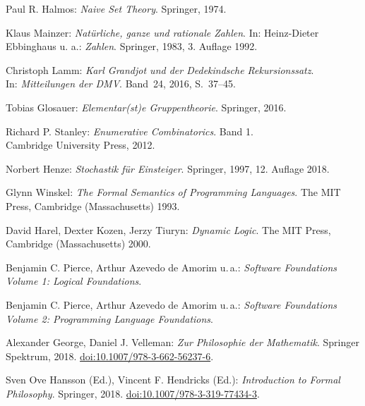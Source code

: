 \begin{thebibliography}{00}
 Paul R. Halmos:
\emph{Naive Set Theory}. Springer, 1974.

 Klaus Mainzer:
\emph{Natürliche, ganze und rationale Zahlen}.
In: Heinz-Dieter Ebbinghaus u. a.: \emph{Zahlen}.
Springer, 1983, 3. Auflage 1992.

 Christoph Lamm:
\emph{Karl Grandjot und der Dedekindsche Rekursionssatz}.\\
In: \emph{Mitteilungen der DMV}. Band~24, 2016, S.~37--45.

 Tobias Glosauer:
\emph{Elementar(st)e Gruppentheorie}.
Springer, 2016.

 Richard P. Stanley:
\emph{Enumerative Combinatorics}. Band 1.\\
Cambridge University Press, 2012.

 Norbert Henze: \emph{Stochastik für Einsteiger}.
Springer, 1997, 12. Auflage 2018.

 Glynn Winskel:
\emph{The Formal Semantics of Programming Languages}.
The MIT Press, Cambridge (Massachusetts) 1993.

 David Harel, Dexter Kozen, Jerzy Tiuryn:
\emph{Dynamic Logic}.
The MIT Press, Cambridge (Massachusetts) 2000.

 Benjamin C. Pierce, Arthur Azevedo de Amorim u.\,a.:
\emph{Software Foundations Volume 1: Logical Foundations}.

 Benjamin C. Pierce, Arthur Azevedo de Amorim u.\,a.:
\emph{Software Foundations Volume 2: Programming Language Foundations}.

 Alexander George, Daniel J. Velleman:
\emph{Zur Philosophie der Mathematik}. Springer Spektrum,
2018. \href{https://doi.org/10.1007/978-3-662-56237-6}{doi:10.1007/978-3-662-56237-6}.

 Sven Ove Hansson (Ed.), Vincent F. Hendricks (Ed.):
\emph{Introduction to Formal Philosophy}. Springer, 2018.
\href{https://doi.org/10.1007/978-3-319-77434-3}{doi:10.1007/978-3-319-77434-3}.

\end{thebibliography}

